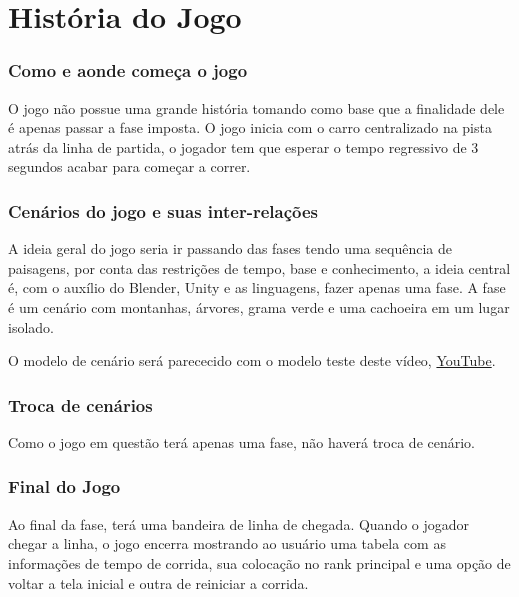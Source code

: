 \part{História do Jogo}

\section{Como e aonde começa o jogo}

O jogo não possue uma grande história tomando como base que a finalidade dele é apenas passar a fase imposta. O jogo inicia com o carro centralizado na pista atrás da linha de partida, o jogador tem que esperar o tempo regressivo de 3 segundos acabar para começar a correr.

\section{Cenários do jogo e suas inter-relações}

A ideia geral do jogo seria ir passando das fases tendo uma sequência de paisagens, por conta das restrições de tempo, base e conhecimento, a ideia central é, com o auxílio do Blender, Unity e as linguagens, fazer apenas uma fase. A fase \'e um cen\'ario com montanhas, \'arvores, grama verde e uma cachoeira em um lugar isolado.

O modelo de cen\'ario ser\'a parececido com o modelo teste deste v\'ideo,  \href{https://www.youtube.com/watch?v=9V2GcBU732g}{YouTube}.

\section{Troca de cen\'arios}

Como o jogo em quest\~ao ter\'a apenas uma fase, não haverá troca de cenário.

\section{Final do Jogo}

Ao final da fase, terá uma bandeira de linha de chegada. Quando o jogador chegar a linha, o jogo encerra mostrando ao usu\'ario uma tabela com as informações de tempo de corrida, sua colocação no rank principal e uma opção de voltar a tela inicial e outra de reiniciar a corrida.

